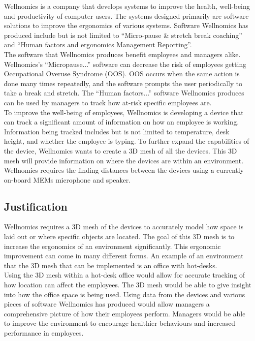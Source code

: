 \documentclass[9pt, a4paper]{report}
\begin{document}
	Wellnomics is a company that develops systems to improve the health, well-being and productivity of computer users. The systems designed primarily are software solutions to improve the ergonomics of various systems. Software Wellnomics has produced include but is not limited to ``Micro-pause \&
stretch break coaching'' and ``Human factors and ergonomics Management Reporting''.\\

	The software that Wellnomics produces benefit employees and managers alike. Wellnomics’s ``Micropause...'' software can decrease the risk of employees getting Occupational Overuse Syndrome (OOS). OOS occurs when the same action is done many times repeatedly, and the software prompts the user periodically to take a break and stretch. The ``Human factors...'' software Wellnomics produces can be used by managers to track how at-risk specific employees are.\\

	To improve the well-being of employees, Wellnomics is developing a device that can track a significant amount of information on how an employee is working. Information being tracked includes but is not limited to temperature, desk height, and whether the employee is typing. To further expand the capabilities of the device, Wellnomics wants to create a 3D mesh of all the devices. This 3D mesh will provide information on where the devices are within an environment. Wellnomics requires the finding distances between the devices using a currently on-board MEMs microphone and speaker.

	\subsection*{Justification}
	
	Wellnomics requires a 3D mesh of the devices to accurately model how space is laid out or where specific objects are located. The goal of this 3D mesh is to increase the ergonomics of an environment significantly. This ergonomic improvement can come in many different forms. An example of an environment that the 3D mesh that can be implemented is an office with hot-desks.\\

	Using the 3D mesh within a hot-desk office would allow for accurate tracking of how location can affect the employees. The 3D mesh would be able to give insight into how the office space is being used. Using data from the devices and various pieces of software Wellnomics has produced would allow managers a comprehensive picture of how their employees perform. Managers would be able to improve the environment to encourage healthier behaviours and increased performance in employees.
	
\end{document}

